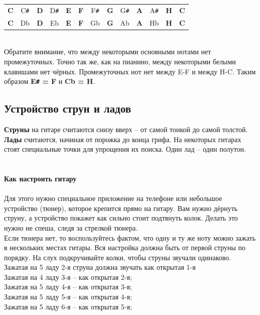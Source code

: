 \documentclass[fleqn,a5paper,12pt,twoside]{guitartabs}
\newcommand{\musSharp}{\texttt{\#}}
\begin{document}
\begin{tabular}{|c|c|c|c|c|c|c|c|c|c|c|c|c|}
\hline
\textbf{C} & C\musSharp & \textbf{D} & D\musSharp & \textbf{E} & \textbf{F} & F\musSharp & \textbf{G} & G\musSharp & \textbf{A} & A\musSharp & \textbf{H} & \textbf{C} \\
\textbf{C} & Db & \textbf{D} & Eb & \textbf{E} & \textbf{F} & Gb & \textbf{G} & Ab & \textbf{A} & Hb & \textbf{H} & \textbf{C}\\
\hline
\end{tabular}\\

Обратите внимание, что между некоторыми основными нотами нет промежуточных. Точно так же, как на пианино, между некоторыми белыми клавишами нет чёрных. Промежуточных нот нет между E-F и между H-C.
Таким образом \textbf{E\musSharp{} = F} и \textbf{Cb = H}.
\newpage
{}%
\subsection*{Устройство струн и ладов}
\textbf{Струны} на гитаре считаются снизу вверх -- от самой тонкой до самой толстой. \\
\textbf{Лады} считаются, начиная от порожка до конца грифа. На некоторых гитарах стоят специальные точки для упрощения их поиска. Один лад -- один полутон.\vspace{7mm}\\
\muschordscheme[
name = $\leftarrow$розетка |  колки$\rightarrow$,
finger    = {1/6:I лад, 2/6:II лад, 3/6:III лад, 4/6:IV лад},
]\\
\\
\textbf{Как настроить гитару}\\
\\
Для этого нужно специальное приложение на телефоне или небольшое устройство (тюнер), которое крепится прямо на гитару. Вам нужно дёрнуть струну, а устройство покажет как сильно стоит подтянуть колок. Делать это нужно не спеша, следя за стрелкой тюнера.\\
Если тюнера нет, то воспользуйтесь фактом, что одну и ту же ноту можно зажать в нескольких местах гитары. Вся настройка должна быть от первой струны по порядку. На слух подкручивайте колки, чтобы струны звучали одинаково.\\
Зажатая на 5 ладу 2-я струна должна звучать как открытая 1-я\\
Зажатая на 4 ладу 3-я -- как открытая 2-я; \\
Зажатая на 5 ладу 4-я -- как открытая 3-я; \\
Зажатая на 5 ладу 5-я -- как открытая 4-я; \\
Зажатая на 5 ладу 6-я -- как открытая 5-я;\\
\end{document}
